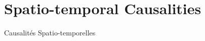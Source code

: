 

\newpage





\section[Spatio-temporal Causalities][Causalités Spatio-temporelles]{Spatio-temporal Causalities}{Causalités Spatio-temporelles}

\label{sec:causalityregimes}






